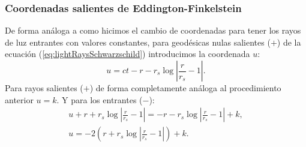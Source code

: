 \subsubsection{Coordenadas salientes de Eddington-Finkelstein}
De forma análoga a como hicimos el cambio de coordenadas para tener los rayos de luz entrantes con valores constantes, para geodésicas nulas salientes (\(+\)) de la ecuación (\ref{eq:lightRaysSchwarzschild}) introducimos la coordenada \( u \):
\begin{equation}
        u  = ct - r - r_s \log \left| \frac{r}{r_s} - 1 \right|.
\end{equation}
Para rayos salientes (\(+\)) de forma completamente análoga al procedimiento anterior \(u = k\).
Y para los entrantes (\(-\)):
\begin{equation}
    \begin{aligned}
        u + r + r_s \log \left| \frac{r}{r_s} - 1 \right| = -r - r_s \log \left| \frac{r}{r_s} - 1 \right| + k, \\
        u = -2\left(r + r_s \log \left| \frac{r}{r_s} - 1 \right|  \right) +k.
    \end{aligned}
\end{equation}
